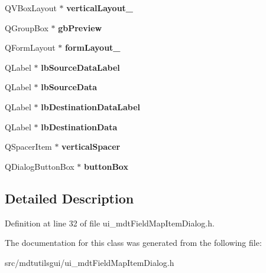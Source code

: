 \begin{DoxyCompactItemize}
\item 
\hypertarget{class_ui__mdt_field_map_item_dialog_a82853f9f0f0dd223a85acd1d02e3a913}{
QVBoxLayout $\ast$ {\bfseries verticalLayout\_}}
\label{class_ui__mdt_field_map_item_dialog_a82853f9f0f0dd223a85acd1d02e3a913}

\item 
\hypertarget{class_ui__mdt_field_map_item_dialog_a1af87d49353d444fd572b41865952f2b}{
QGroupBox $\ast$ {\bfseries gbPreview}}
\label{class_ui__mdt_field_map_item_dialog_a1af87d49353d444fd572b41865952f2b}

\item 
\hypertarget{class_ui__mdt_field_map_item_dialog_a010f84c75b657df551a246d9578ce88a}{
QFormLayout $\ast$ {\bfseries formLayout\_}}
\label{class_ui__mdt_field_map_item_dialog_a010f84c75b657df551a246d9578ce88a}

\item 
\hypertarget{class_ui__mdt_field_map_item_dialog_ad8d1ee4b1da2b756f41037fa8f3cdb25}{
QLabel $\ast$ {\bfseries lbSourceDataLabel}}
\label{class_ui__mdt_field_map_item_dialog_ad8d1ee4b1da2b756f41037fa8f3cdb25}

\item 
\hypertarget{class_ui__mdt_field_map_item_dialog_ad6174a4c1d79afc5d4a4d8e3e72f2bd1}{
QLabel $\ast$ {\bfseries lbSourceData}}
\label{class_ui__mdt_field_map_item_dialog_ad6174a4c1d79afc5d4a4d8e3e72f2bd1}

\item 
\hypertarget{class_ui__mdt_field_map_item_dialog_a7d06a303f0040c61eddd7120bd192600}{
QLabel $\ast$ {\bfseries lbDestinationDataLabel}}
\label{class_ui__mdt_field_map_item_dialog_a7d06a303f0040c61eddd7120bd192600}

\item 
\hypertarget{class_ui__mdt_field_map_item_dialog_a72b7328bf5e2750ca3288a2c723937e4}{
QLabel $\ast$ {\bfseries lbDestinationData}}
\label{class_ui__mdt_field_map_item_dialog_a72b7328bf5e2750ca3288a2c723937e4}

\item 
\hypertarget{class_ui__mdt_field_map_item_dialog_acb7c62fcf790e211f5738c044526afa9}{
QSpacerItem $\ast$ {\bfseries verticalSpacer}}
\label{class_ui__mdt_field_map_item_dialog_acb7c62fcf790e211f5738c044526afa9}

\item 
\hypertarget{class_ui__mdt_field_map_item_dialog_a0dc097731c70dca1ac8c5abfd044fcc9}{
QDialogButtonBox $\ast$ {\bfseries buttonBox}}
\label{class_ui__mdt_field_map_item_dialog_a0dc097731c70dca1ac8c5abfd044fcc9}

\end{DoxyCompactItemize}


\subsection{Detailed Description}


Definition at line 32 of file ui\_\-mdtFieldMapItemDialog.h.



The documentation for this class was generated from the following file:\begin{DoxyCompactItemize}
\item 
src/mdtutilsgui/ui\_\-mdtFieldMapItemDialog.h\end{DoxyCompactItemize}

